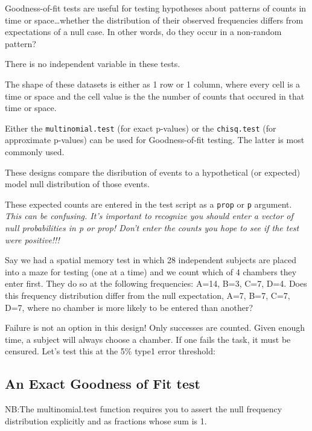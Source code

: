 \documentclass[]{book}
\begin{document}
Goodness-of-fit tests are useful for testing hypotheses about patterns of counts in time or space\ldots{}whether the distribution of their observed frequencies differs from expectations of a null case. In other words, do they occur in a non-random pattern?

There is no independent variable in these tests.

The shape of these datasets is either as 1 row or 1 column, where every cell is a time or space and the cell value is the the number of counts that occured in that time or space.

Either the \texttt{multinomial.test} (for exact p-values) or the \texttt{chisq.test} (for approximate p-values) can be used for Goodness-of-fit testing. The latter is most commonly used.

These designs compare the disribution of events to a hypothetical (or expected) model null distribution of those events.

These expected counts are entered in the test script as a \texttt{prop} or \texttt{p} argument. \emph{This can be confusing. It's important to recognize you should enter a vector of null probabilities in p or prop! Don't enter the counts you hope to see if the test were positive!!!}

Say we had a spatial memory test in which 28 independent subjects are placed into a maze for testing (one at a time) and we count which of 4 chambers they enter first. They do so at the following frequencies: A=14, B=3, C=7, D=4. Does this frequency distribution differ from the null expectation, A=7, B=7, C=7, D=7, where no chamber is more likely to be entered than another?

Failure is not an option in this design! Only successes are counted. Given enough time, a subject will always choose a chamber. If one fails the task, it must be censured. Let's test this at the 5\% type1 error threshold:

\hypertarget{an-exact-goodness-of-fit-test}{%
\subsection{An Exact Goodness of Fit test}\label{an-exact-goodness-of-fit-test}}

NB:The multinomial.test function requires you to assert the null frequency distribution explicitly and as fractions whose sum is 1.
\end{document}
